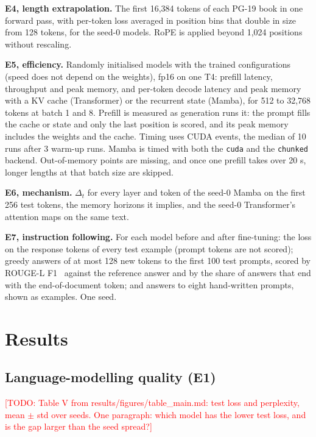 \documentclass[conference]{IEEEtran}
\newcommand{\todo}[1]{\textcolor{red}{[TODO: #1]}}
\begin{document}
\textbf{E4, length extrapolation.} The first 16,384 tokens of each PG-19 book in one forward pass, with
per-token loss averaged in position bins that double in size from 128 tokens, for the seed-0 models.
RoPE is applied beyond 1,024 positions without rescaling.

\textbf{E5, efficiency.} Randomly initialised models with the trained configurations (speed does not
depend on the weights), fp16 on one T4: prefill latency, throughput and peak memory, and per-token
decode latency and peak memory with a KV cache (Transformer) or the recurrent state (Mamba), for 512 to
32,768 tokens at batch 1 and 8. Prefill is measured as generation runs it: the prompt fills the cache or
state and only the last position is scored, and its peak memory includes the weights and the cache. Timing uses CUDA events, the median of 10 runs after 3 warm-up runs. Mamba is timed with
both the \texttt{cuda} and the \texttt{chunked} backend. Out-of-memory points are missing, and once one
prefill takes over 20 s, longer lengths at that batch size are skipped.

\textbf{E6, mechanism.} $\Delta_t$ for every layer and token of the seed-0 Mamba on the first 256 test
tokens, the memory horizons it implies, and the seed-0 Transformer's attention maps on the same text.

\textbf{E7, instruction following.} For each model before and after fine-tuning: the loss on the
response tokens of every test example (prompt tokens are not scored); greedy answers of at most 128 new
tokens to the first 100 test prompts, scored by ROUGE-L F1~\cite{lin2004rouge} against the reference
answer and by the share of answers that end with the end-of-document token; and answers to eight
hand-written prompts, shown as examples. One seed.

\section{Results}

\subsection{Language-modelling quality (E1)}
\todo{Table V from results/figures/table\_main.md: test loss and perplexity, mean $\pm$ std over
seeds. One paragraph: which model has the lower test loss, and is the gap larger than the seed spread?}
\end{document}
